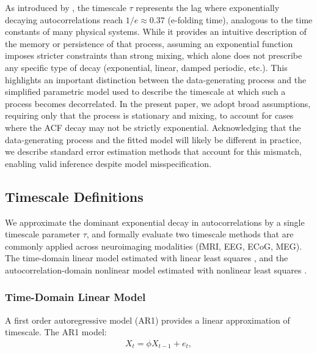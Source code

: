 \documentclass[docs/main.tex]{subfiles}
\begin{document}
As introduced by \citet{murray_hierarchy_2014}, the timescale $\tau$ represents the lag where exponentially decaying autocorrelations reach $1/e \approx 0.37$ (e-folding time), analogous to the time constants of many physical systems. While it provides an intuitive description of the memory or persistence of that process, assuming an exponential function imposes stricter constraints than strong mixing, which alone does not prescribe any specific type of decay (exponential, linear, damped periodic, etc.). This highlights an important distinction between the data-generating process and the simplified parametric model used to describe the timescale at which such a process becomes decorrelated. In the present paper, we adopt broad assumptions, requiring only that the process is stationary and mixing, to account for cases where the ACF decay may not be strictly exponential. Acknowledging that the data-generating process and the fitted model will likely be different in practice, we describe standard error estimation methods that account for this mismatch, enabling valid inference despite model misspecification.

\subsection{Timescale Definitions}
We approximate the dominant exponential decay in autocorrelations by a single timescale parameter $\tau$, and formally evaluate two timescale methods that are commonly applied across neuroimaging modalities (fMRI, EEG, ECoG, MEG). The time-domain linear model estimated with linear least squares \citep{kaneoke_variance_2012, meisel_decline_2017, huang_timescales_2018, lurie_cortical_2024, shinn_functional_2023, shafiei_topographic_2020, spitmaan_multiple_2020, trepka_training-dependent_2024}, and the autocorrelation-domain nonlinear model estimated with nonlinear least squares \citep{rossi-pool_invariant_2021, cirillo_neural_2018, ito_cortical_2020, runyan_distinct_2017, zeraati_flexible_2022, nougaret_intrinsic_2021, wasmuht_intrinsic_2018, muller_core_2020, maisson_choice-relevant_2021, li_hierarchical_2022, shafiei_topographic_2020}.


\subsubsection{Time-Domain Linear Model}\label{sec:time-domain-linear-model}
A first order autoregressive model (AR1) provides a linear approximation of timescale. The AR1 model:
\begin{align}\label{eq:ar1}
    X_t = \phi X_{t-1} + e_t,
\end{align}
\end{document}
